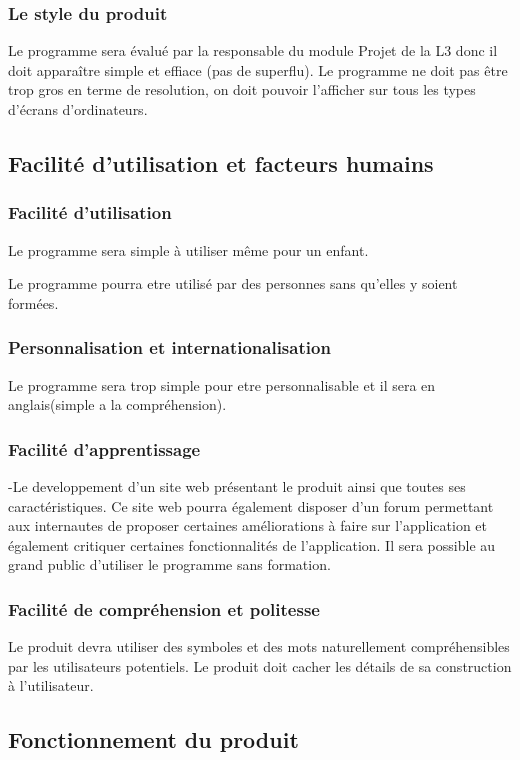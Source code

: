 \documentclass[a4]{article}
\begin{document}
			\subsubsection {Le style du produit}
				Le programme sera évalué par la responsable du module Projet de la L3 donc il doit apparaître simple et effiace (pas de superflu).
				Le programme ne doit pas être trop gros en terme de resolution, on doit pouvoir l'afficher sur 	tous les types d'écrans d'ordinateurs.

		\subsection{Facilité d’utilisation et facteurs humains}
			\subsubsection {Facilité d'utilisation}
				Le programme sera simple à utiliser même pour un enfant.

				Le programme pourra etre utilisé par des personnes sans qu'elles y soient formées.
			\subsubsection {Personnalisation et internationalisation}
				Le programme sera trop simple pour etre personnalisable et il sera en anglais(simple a la compréhension).
			\subsubsection {Facilité d'apprentissage}
				-Le developpement d'un site web présentant le produit ainsi que toutes ses caractéristiques. Ce site web pourra également disposer d'un forum permettant aux internautes de proposer certaines 	améliorations à faire sur l'application et également critiquer certaines fonctionnalités de l'application.
				Il sera possible au grand public d’utiliser le programme sans formation.
			\subsubsection {Facilité de compréhension et politesse}
				Le produit devra utiliser des symboles et des mots naturellement compréhensibles par les
				utilisateurs potentiels.
				Le produit doit cacher les détails de sa construction à l’utilisateur.

		\subsection{Fonctionnement du produit}
\end{document}
